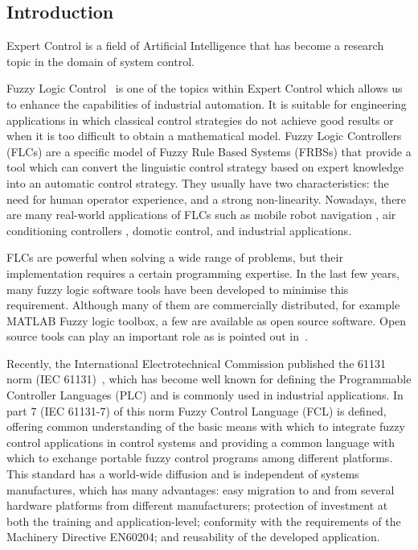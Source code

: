 \documentclass[11pt,twoside]{article}
\begin{document}
\vspace*{10pt}\textlineskip
\begin{multicols}{2}

\section{Introduction}
Expert Control is a field of Artificial Intelligence that has become a research topic in the domain of system control. 

Fuzzy Logic Control~\cite{Lee90,DHR93,Bon94} is one of the topics within Expert Control which allows us to enhance the capabilities of industrial automation. It is suitable for engineering applications in which classical control strategies do not achieve good results or when it is too difficult to obtain a mathematical model. Fuzzy Logic Controllers (FLCs) are a specific model of Fuzzy Rule Based Systems (FRBSs) that provide a tool which can convert the linguistic control strategy based on expert knowledge into an automatic control strategy. They usually have two characteristics: the need for human operator experience, and a strong non-linearity. Nowadays, there are many real-world applications of FLCs such as mobile robot navigation \cite{EH2010,JCh2011}, air conditioning controllers \cite{Alc09,Cho11}, domotic control\cite{Cha12,AL05}, and industrial applications\cite{Otero2008,Demir12,ZG2012}.

FLCs are powerful when solving a wide range of problems, but their implementation requires a certain programming expertise. In the last few years, many fuzzy logic software tools have been developed to minimise this requirement. Although many of them are commercially distributed, for example MATLAB Fuzzy logic toolbox, a few are available as open source software. Open source tools can play an important role as is pointed out in~\cite{Sonnenburg07}. 

Recently, the International Electrotechnical Commission published the 61131 norm (IEC 61131)~\cite{IEC}, which has become well known for defining the Programmable Controller Languages (PLC) and is commonly used in industrial applications. In part 7 (IEC 61131-7) of this norm Fuzzy Control Language (FCL) is defined, offering common understanding of the basic means with which to integrate fuzzy control applications in control systems and providing a common language with which to exchange portable fuzzy control programs among different platforms. This standard has a world-wide diffusion and is independent of systems manufactures, which has many advantages: easy migration to and from several hardware platforms from different manufacturers; protection of investment at both the training and application-level; conformity with the requirements of the Machinery Directive EN60204; and reusability of the developed application.


\end{multicols}
\end{document}
